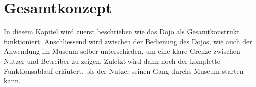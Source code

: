 \section{Gesamtkonzept}\label{sec:gesamtkonzept}
In diesem Kapitel wird zuerst beschrieben wie das Dojo als Gesamtkonstrukt funktioniert. Anschliessend wird zwischen der Bedienung des Dojos, wie auch der Anwendung im Museum selber unterschieden, um eine klare Grenze zwischen Nutzer und Betreiber zu zeigen. Zuletzt wird dann noch der komplette Funktionsablauf erläutert, bis der Nutzer seinen Gang durchs Museum starten kann.